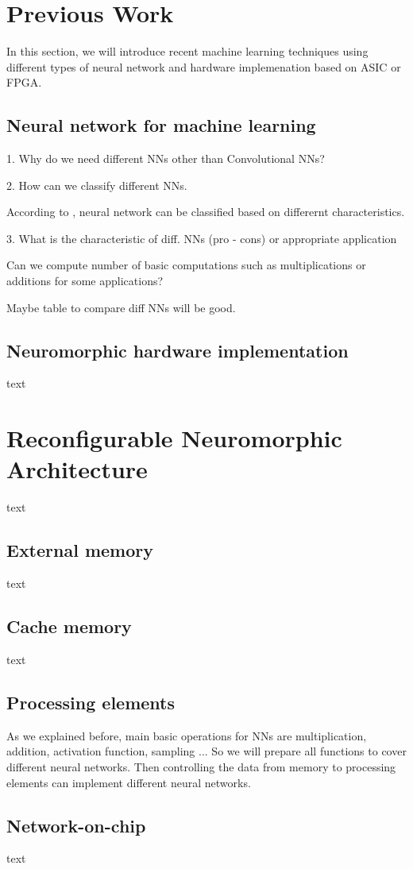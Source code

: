 \documentclass[pageno]{jpaper}
\begin{document}
\section{Previous Work}
In this section, we will introduce recent machine learning techniques using different types of neural network and hardware implemenation based on ASIC or FPGA. 

\subsection{Neural network for machine learning} 
1. Why do we need different NNs other than Convolutional NNs?

2. How can we classify different NNs.

According to \cite{basheer2000artificial}, neural network can be classified based on differernt characteristics.


3. What is the characteristic of diff. NNs (pro - cons) or appropriate application

Can we compute number of basic computations such as multiplications or additions for some applications? 

Maybe table to compare diff NNs will be good.
\subsection{Neuromorphic hardware implementation}
text


\section{Reconfigurable Neuromorphic Architecture}
text
\subsection{External memory}
text
\subsection{Cache memory}
text
\subsection{Processing elements}
As we explained before, main basic operations for NNs are multiplication, addition, activation function, sampling ... So we will prepare all functions to cover different neural networks. Then controlling the data from memory to processing elements can implement different neural networks.
\subsection{Network-on-chip}
text
\end{document}
